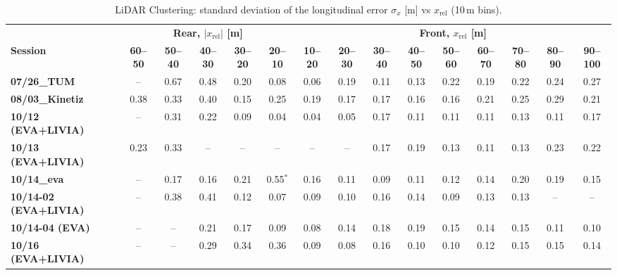 \begin{landscape}
\begin{table}[H]
\centering
\setlength{\tabcolsep}{2.6pt}\small\renewcommand{\arraystretch}{0.85}
\begin{tabular}{|lccccc|ccccccccc|}
\hline
 \rowcolor{bluepoli!40} &\multicolumn{5}{c|}{\textbf{Rear, $|x_{\mathrm{rel}}|$ [m]}}&\multicolumn{9}{c|}{\textbf{Front, $x_{\mathrm{rel}}$ [m]}} \\
\rowcolor{bluepoli!40} \textbf{Session} & \textbf{60--50} & \textbf{50--40} & \textbf{40--30} & \textbf{30--20} & \textbf{20--10} & \textbf{10--20} & \textbf{20--30} & \textbf{30--40} & \textbf{40--50} & \textbf{50--60} & \textbf{60--70} & \textbf{70--80} & \textbf{80--90} & \textbf{90--100} \\
\hline\hline
\textbf{07/26\_TUM} & -- & 0.67 & 0.48 & 0.20 & 0.08 & 0.06 & 0.19 & 0.11 & 0.13 & 0.22 & 0.19 & 0.22 & 0.24 & 0.27 \\
\textbf{08/03\_Kinetiz} & 0.38 & 0.33 & 0.40 & 0.15 & 0.25 & 0.19 & 0.17 & 0.17 & 0.16 & 0.16 & 0.21 & 0.25 & 0.29 & 0.21 \\
\textbf{10/12 (EVA+LIVIA)} & -- & 0.31 & 0.22 & 0.09 & 0.04 & 0.04 & 0.05 & 0.17 & 0.11 & 0.11 & 0.11 & 0.13 & 0.11 & 0.17 \\
\textbf{10/13 (EVA+LIVIA)} & 0.23 & 0.33 & -- & -- & -- & -- & -- & 0.17 & 0.19 & 0.13 & 0.11 & 0.13 & 0.23 & 0.22 \\
\textbf{10/14\_eva} & -- & 0.17 & 0.16 & 0.21 & 0.55$^{*}$ & 0.16 & 0.11 & 0.09 & 0.11 & 0.12 & 0.14 & 0.20 & 0.19 & 0.15 \\
\textbf{10/14-02 (EVA+LIVIA)} & -- & 0.38 & 0.41 & 0.12 & 0.07 & 0.09 & 0.10 & 0.16 & 0.14 & 0.09 & 0.13 & 0.13 & -- & -- \\
\textbf{10/14-04 (EVA)} & -- & -- & 0.21 & 0.17 & 0.09 & 0.08 & 0.14 & 0.18 & 0.19 & 0.15 & 0.14 & 0.15 & 0.11 & 0.10 \\
\textbf{10/16 (EVA+LIVIA)} & -- & -- & 0.29 & 0.34 & 0.36 & 0.09 & 0.08 & 0.16 & 0.10 & 0.10 & 0.12 & 0.15 & 0.15 & 0.14 \\
\hline
\end{tabular}
\par{}
\caption{LiDAR Clustering: standard deviation of the longitudinal error $\sigma_x$ [m] vs $x_{\mathrm{rel}}$ (10\,m bins).}
\label{tab:clust_sx}
\end{table}


\end{landscape}
